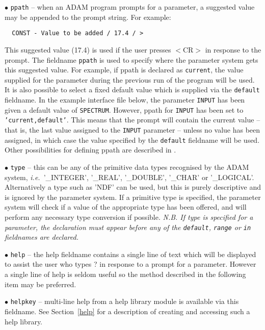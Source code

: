 \begin{description}
\item{$\bullet$ \tt ppath} -- 
when an ADAM program prompts for a parameter, a suggested value
may be appended to the prompt string. For example:
\begin{verbatim}
  CONST - Value to be added / 17.4 / >
\end{verbatim}
This suggested value (17.4) is used if the user presses
$<$CR$>$ in response to the prompt.
The fieldname {\tt ppath} 
is used to specify where the parameter system gets this suggested value.
For example, if ppath is declared as {\tt current}, the value supplied for 
the parameter during the
previous run of the program will be used.
It is also possible to select a  fixed default value which is supplied
via the {\tt default}  fieldname.
In the example interface file below, the parameter {\tt INPUT}
has been given a default value of {\tt SPECTRUM}.
However, ppath for {\tt INPUT} has been 
set to {\tt 'current,default'}. This means that the prompt will contain the 
current value -- that is, the last 
value assigned to the {\tt INPUT} parameter -- unless no value has been assigned, in
which case the value specified by the {\tt default} fieldname will be used.
Other possibilities for defining ppath are described in 
.

\item{$\bullet$ \tt type} -- this can be any of the primitive data types 
recognised by the ADAM system, {\it i.e.}\ '\_INTEGER', '\_REAL', '\_DOUBLE', 
'\_CHAR' or '\_LOGICAL'.
Alternatively a type such as 'NDF' can be used, but this is purely
descriptive and is ignored by the parameter system.
If a primitive type is specified, the parameter system 
will check if a value of the appropriate type has been offered, and will
perform any necessary type conversion if possible.
{\sl N.B. If type is specified for a parameter, the declaration  must appear 
before any of the {\tt default}, {\tt range} or  {\tt in} fieldnames
are declared.}

\item{$\bullet$ \tt help} -- the help fieldname contains a single line
of text which will be displayed to assist the user who types ? in response to a 
prompt for a parameter. However a single line of help is seldom useful so
the method described in the following item may be  preferred.

\item{$\bullet$ \tt helpkey} -- multi-line help from a help library
module is available via this 
fieldname. See Section~\ref{help} for a description of creating and
accessing such a help 
library.



\end{description}
